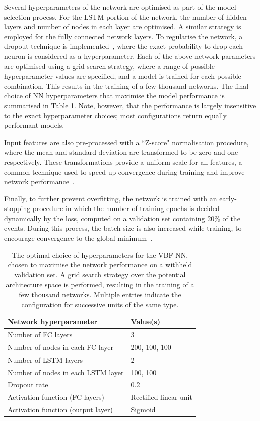 Several hyperparameters of the network are optimised as part of the model selection process.
For the LSTM portion of the network, the number of hidden layers and number of nodes
in each layer are optimised. A similar strategy is employed for the fully connected network layers. To regularise the network, a dropout technique is implemented~\cite{dropout}, where the exact probability to drop each neuron is considered as a hyperparameter. Each of the above network parameters are optimised using a grid search strategy, where a range of possible hyperparameter values are specified, and a model is trained for each possible combination. This results in the training of a few thousand networks. The final choice of NN hyperparameters that maximise the model performance is summarised in Table \ref{tab:dnn_final_hps}. Note, however, that the performance is largely insensitive to the exact hyperparameter choices; most configurations return equally performant models.
 
Input features are also pre-processed with a ``Z-score" normalisation procedure,
where the mean and standard deviation are transformed to be zero and one respectively. These transformations provide a uniform scale for all features, a common technique used to speed up convergence during training and improve network performance~\cite{backprop}.

Finally, to further prevent overfitting, the network is trained with an early-stopping procedure in which the number of training epochs is decided dynamically by the loss, computed on a validation set containing 20\% of the events. During this process, the batch size is also increased while training, to encourage convergence to the global minimum~\cite{batch_boost}. 
 
\begin{table}[htbp!]
\centering
\caption[The hyperparameter configuration for the VBF LSTM neural network.]{The optimal choice of hyperparameters for the VBF NN, chosen to maximise the network performance on a withheld validation set. A grid search strategy over the potential architecture space is performed, resulting in the training of a few thousand networks. Multiple entries indicate the configuration for successive units of the same type.}
\label{tab:dnn_final_hps}
\begin{tabular}{l|l}
\hline
Network hyperparameter    & Value(s) \\ \hline 
Number of FC layers & 3       \\
Number of nodes in each FC layer & 200, 100, 100\\
Number of LSTM layers & 2 \\
Number of nodes in each LSTM layer & 100, 100 \\
Dropout rate & 0.2 \\ 
Activation function (FC layers) & Rectified linear unit \\
Activation function (output layer) & Sigmoid \\
\hline
\end{tabular}                  
\end{table}  


